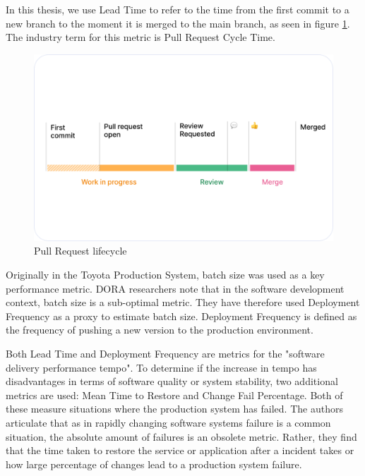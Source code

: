 In this thesis, we use Lead Time to refer to the time from the first commit to a new branch to the moment it is merged to the main branch, as seen in figure \ref{fig:CycleTime}. The industry term for this metric is Pull Request Cycle Time. 

\begin{figure}[ht]
    \begin{center}
        \includegraphics[width=13.5cm]{images/cycletime_defined}
        \caption{Pull Request lifecycle~\cite{swarmia_reducing_nodate}}
        \label{fig:CycleTime}
    \end{center}
\end{figure}

Originally in the Toyota Production System, batch size was used as a key performance metric. DORA researchers note that in the software development context, batch size is a sub-optimal metric. They have therefore used Deployment Frequency as a proxy to estimate batch size. Deployment Frequency is defined as the frequency of pushing a new version to the production environment.  

Both Lead Time and Deployment Frequency are metrics for the "software delivery performance tempo". To determine if the increase in tempo has disadvantages in terms of software quality or system stability, two additional metrics are used: Mean Time to Restore and Change Fail Percentage. Both of these measure situations where the production system has failed. The authors articulate that as in rapidly changing software systems failure is a common situation, the absolute amount of failures is an obsolete metric. Rather, they find that the time taken to restore the service or application after a incident takes or how large percentage of changes lead to a production system failure. 

